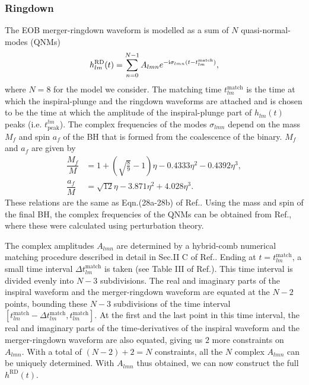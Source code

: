 \documentclass[aps,
prd,
amsmath,
amssymb,
twocolumn,
floatfix,
groupedaddress]{revtex4-1}
\newcommand{\Sum}{\displaystyle\sum\limits}
\newcommand{\ii}{{\rm i}}
\newcommand{\peak}{\mathrm{peak}}
\newcommand{\RD}{\mathrm{RD}}
\def\l({\left(}
\def\r){\right)}
\begin{document}
\subsubsection{Ringdown}\label{sec:level3:RD}
The EOB merger-ringdown waveform is modelled as a sum of $N$ quasi-normal-modes (QNMs) \citep{EOBNRdevel01,EOBNRdevel02,EOBNRdevel04}
\begin{equation}
h_{lm}^{\RD}(t) = \Sum^{N-1}_{n=0}A_{lmn}e^{-\ii\sigma_{lmn}(t-t_{lm}^{\mathrm{match}})},
\end{equation}
where $N=8$ for the model we consider. The matching time $t_{lm}^{\mathrm{match}}$ is the time at which the inspiral-plunge and the ringdown waveforms are attached and is chosen to be the time at which the amplitude of the inspiral-plunge part of $h_{lm}(t)$ peaks (i.e. $t^{lm}_{\peak}$)\citep{EOBNRdevel01,BuonannoEOBv2Main}. The complex frequencies of the modes  $\sigma_{lmn}$  depend on the mass $M_f$ and spin $a_f$ of the BH that is formed from the coalescence of the binary. $M_f$ and $a_f$ are given by
\begin{subequations}
\begin{align}
\dfrac{M_f}{M} &= 1 + \l(\sqrt{\frac{8}{9}}-1\r)\eta - 0.4333\eta^2 - 0.4392\eta^3,\\
\dfrac{a_f}{M} &= \sqrt{12}\eta - 3.871\eta^2 + 4.028\eta^3.
\end{align}
\end{subequations}
These relations are the same as Eqn.(28a-28b) of Ref.\citep{BuonannoEOBv2Main}. Using the mass and spin of the final BH, the complex frequencies of the QNMs can be obtained from Ref.\citep{BHRDQNMs}, where these were calculated using perturbation theory. 

The complex amplitudes $A_{lmn}$ are determined by a hybrid-comb numerical matching procedure described in detail in Sec.II C of Ref.\citep{BuonannoEOBv2Main}. Ending at $t=t_{lm}^{\mathrm{match}}$, a small time interval $\Delta t^{\mathrm{match}}_{lm}$ is taken (see Table III of Ref.\citep{BuonannoEOBv2Main}). This time interval is divided evenly into $N-3$ subdivisions. The real and imaginary parts of the inspiral waveform and the merger-ringdown waveform are equated at the $N-2$ points, bounding these $N-3$ subdivisions of the time interval $\left[t_{lm}^{\mathrm{match}}-\Delta t^{\mathrm{match}}_{lm},t_{lm}^{\mathrm{match}}\right]$. At the first and the last point in this time interval, the real and imaginary parts of the time-derivatives of the inspiral waveform and the merger-ringdown waveform are also equated, giving us $2$ more constraints on $A_{lmn}$. With a total of $(N-2)+2=N$ constraints, all the $N$ complex $A_{lmn}$ can be uniquely determined.
With $A_{lmn}$ thus obtained, we can now construct the full $h^{\RD}(t)$.
\end{document}
